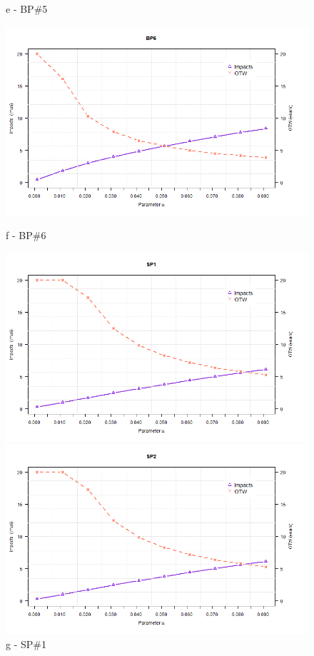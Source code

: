 \begin{figure}[!htb]
\begin{minipage}[b]{0.5\linewidth}
		\caption*{e - BP\#5}
	\end{minipage}
	\hspace{0.05cm}
	\begin{minipage}[b]{0.5\linewidth}
		\centering
		\includegraphics[width=\textwidth]{figures/ch05_fig_saalpha_pump6}
		\caption*{f - BP\#6}
	\end{minipage}
	\hspace{0.05cm}
	\begin{minipage}[b]{0.5\linewidth}
		\centering
		\includegraphics[width=\textwidth]{figures/ch05_fig_saalpha_pump7}
		\caption*{g -  SP\#1}
	\end{minipage}
	\hspace{0.05cm}
	\begin{minipage}[b]{0.5\linewidth}
		\centering
		\includegraphics[width=\textwidth]{figures/ch05_fig_saalpha_pump8}

\end{minipage}
\end{figure}
